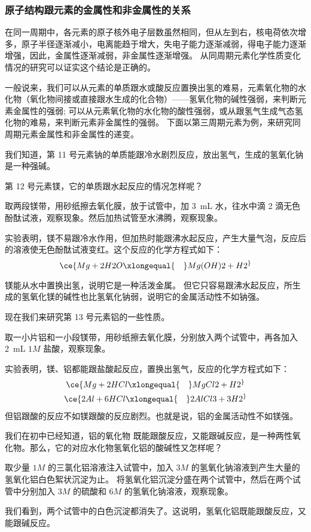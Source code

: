 \subsubsection{原子结构跟元素的金属性和非金属性的关系}
在同一周期中，各元素的原子核外电子层数虽然相同，但从左到右，核电荷依次增多，原子半径逐渐减小，电离能趋于增大，失电子能力逐渐减弱，得电子能力逐渐增强，因此，金属性逐渐减弱，非金属性逐渐增强。
从同周期元素化学性质变化情况的研究可以证实这个结论是正确的。

一般说来，我们可以从元素的单质跟水或酸反应置换出氢的难易，元素氧化物的水化物（氧化物间接或直接跟水生成的化合物）——氢氧化物的碱性强弱，来判断元素金属性的强弱; 可以从元素氧化物的水化物的酸性强弱，或从跟氢气生成气态氢化物的难易，来判断元素非金属性的强弱。
下面以第三周期元素为例，来研究同周期元素金属性和非金属性的递变。

我们知道，第 11 号元素钠的单质能跟冷水剧烈反应，放出氢气，生成的氢氧化钠是一种强碱。

第 12 号元素镁，它的单质跟水起反应的情况怎样呢？
\begin{Experiment}
  取两段镁带，用砂纸擦去氧化膜，放于试管中，加 \qty{3}{mL} 水，往水中滴 2 滴无色酚酞试液，观察现象。然后加热试管至水沸腾，观察现象。
\end{Experiment}

实验表明，镁不易跟冷水作用，但加热时能跟沸水起反应，产生大量气泡，反应后的溶液使无色酚酞试液变红。这个反应的化学方程式如下：
\[ \ce{ Mg + 2H2O \xlongequal{\quad} Mg(OH)2 +H2 ^} \]

镁能从水中置换出氢，说明它是一种活泼金属。
但它只容易跟沸水起反应，所生成的氢氧化镁的碱性也比氢氧化钠弱，说明它的金属活动性不如钠强。

现在我们来研究第 13 号元素铝的一些性质。
\begin{Experiment}
取一小片铝和一小段镁带，用砂纸擦去氧化膜，分别放入两个试管中，再各加入 \qty{2}{mL} $1M$ 盐酸，观察现象。
\end{Experiment}

实验表明，镁、铝都能跟盐酸起反应，置换出氢气，反应的化学方程式如下：
\begin{gather*}
  \ce{ Mg + 2HCl \xlongequal{\quad} MgCl2 + H2 ^}\\
  \ce{ 2Al + 6HCl \xlongequal{\quad} 2AlCl3 + 3H2 ^}
\end{gather*}
但铝跟酸的反应不如镁跟酸的反应剧烈。也就是说，铝的金属活动性不如镁强。

我们在初中已经知道，铝的氧化物  既能跟酸反应，又能跟碱反应，是一种两性氧化物。那么，它的对应水化物氢氧化铝的酸碱性又怎样呢？
\begin{Experiment}
取少量 $1M$ 的三氯化铝溶液注入试管中，加入 $3M$ 的氢氧化钠溶液到产生大量的氢氧化铝白色絮状沉淀为止。
将氢氧化铝沉淀分盛在两个试管中，然后在两个试管中分别加入 $3M$ 的硫酸和 $6M$ 的氢氧化钠溶液，观察现象。
\end{Experiment}
我们看到，两个试管中的白色沉淀都消失了。这说明，氢氧化铝既能跟酸反应，又能跟碱反应。

